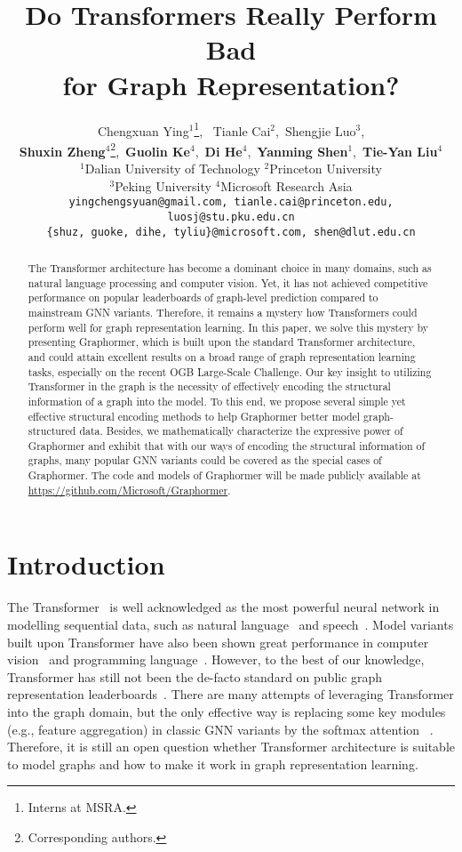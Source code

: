 \documentclass{article}
\title{Do Transformers Really Perform Bad \\ for Graph Representation? }
\author{%
Chengxuan Ying$^1$\thanks{Interns at MSRA.}, \ Tianle Cai$^2$,\ Shengjie Luo$^3$\footnotemark[1], \\ \textbf{Shuxin Zheng}$^4$\thanks{Corresponding authors.},\  \textbf{Guolin Ke}$^4$,\ \textbf{Di He}$^4$\footnotemark[2],\ \textbf{Yanming Shen}$^1$,\ \textbf{Tie-Yan Liu}$^4$\\
$^1$Dalian University of Technology \quad $^2$Princeton University \\
$^3$Peking University \quad $^4$Microsoft Research Asia\\
\texttt{\footnotesize yingchengsyuan@gmail.com, tianle.cai@princeton.edu, luosj@stu.pku.edu.cn} \\
\texttt{\footnotesize \{shuz\footnotemark[2], guoke, dihe\footnotemark[2], tyliu\}@microsoft.com, shen@dlut.edu.cn}}
\begin{document}
\maketitle

\begin{abstract}
The Transformer architecture has become a dominant choice in many domains, such as natural language processing and computer vision. Yet, it has not achieved competitive performance on popular leaderboards of graph-level prediction compared to mainstream GNN variants. Therefore, it remains a mystery how Transformers could perform well for graph representation learning. In this paper, we solve this mystery by presenting Graphormer, which is built upon the standard Transformer architecture, and could attain excellent results on a broad range of graph representation learning tasks, especially on the recent OGB Large-Scale Challenge. Our key insight to utilizing Transformer in the graph is the necessity of effectively encoding the structural information of a graph into the model. To this end, we propose several simple yet effective structural encoding methods to help Graphormer better model graph-structured data. Besides, we mathematically characterize the expressive power of Graphormer and exhibit that with our ways of encoding the structural information of graphs, many popular GNN variants could be covered as the special cases of Graphormer. The code and models of Graphormer will be made publicly available at \url{https://github.com/Microsoft/Graphormer}.


\end{abstract}

\section{Introduction}

The Transformer~\cite{vaswani2017attention} is well acknowledged as the most powerful neural network in modelling sequential data, such as natural language~\cite{devlin2019bert,liu2019roberta,brown2020language} and speech~\cite{gulati2020conformer}. Model variants built upon Transformer have also been shown great performance in computer vision~\cite{dosovitskiy2020image,liu2021Swin} and programming language~\cite{hellendoorn2019global,zugner2020language,peng2021could}. 
However, to the best of our knowledge, Transformer has still not been the de-facto standard on public graph representation leaderboards~\cite{hu2020open,dwivedi2020benchmarking,hu2021ogb}. There are many attempts of leveraging Transformer into the graph domain, but the only effective way is replacing some key modules (e.g., feature aggregation) in classic GNN variants by the softmax attention ~\cite{velivckovic2018graph, cai2020graph,hu2020heterogeneous,wang2020direct,zhang2020graph,rong2020self,dwivedi2021generalization}. 
Therefore, it is still an open question whether Transformer architecture is suitable to model graphs and how to make it work in graph representation learning.
\end{document}
